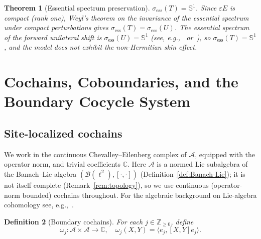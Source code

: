\documentclass[10pt]{amsart}
\newcommand{\1}{{\mathbb{I}}}
\newtheorem{theorem}{Theorem}[section]
\newtheorem{definition}[theorem]{Definition}
\numberwithin{equation}{section}
\begin{document}
\begin{theorem}[Essential spectrum preservation]\label{thm:essential-spectrum}
$\sigma_{\mathrm{ess}}(T) = \mathbb{S}^1$. Since $\varepsilon E$ is compact (rank one),
Weyl's theorem on the invariance of the essential spectrum under compact perturbations
gives $\sigma_{\mathrm{ess}}(T) = \sigma_{\mathrm{ess}}(U)$. The essential spectrum of the
forward unilateral shift is $\sigma_{\mathrm{ess}}(U) = \mathbb{S}^1$
(see, e.g.,~\cite[Ch.~II, \S7]{BotSil06} or~\cite[Vol.~1, Lec.~3]{Nik02}),
so $\sigma_{\mathrm{ess}}(T) = \mathbb{S}^1$, and the model does not exhibit the
non-Hermitian skin effect.
\end{theorem}

\section{Cochains, Coboundaries, and the Boundary Cocycle System}
\label{sec:cohomology}

\subsection{Site-localized cochains}

We work in the continuous Chevalley--Eilenberg complex of $\mathcal{A}$, equipped with the
operator norm, and trivial coefficients $\mathbb{C}$. Here $\mathcal{A}$ is a normed Lie
subalgebra of the Banach--Lie algebra $(\mathcal{B}(\ell^2),[\cdot,\cdot])$
(Definition~\ref{def:Banach-Lie}); it is not itself
complete (Remark~\ref{rem:topology}), so we use continuous (operator-norm bounded) cochains
throughout. For the algebraic background on Lie-algebra cohomology see,
e.g.,~\cite{Hall,Humphreys}.

\begin{definition}[Boundary cochains]\label{def:boundary-cocycles}
For each $j \in \mathbb{Z}_{\ge 0}$, define
\[
\omega_j : \mathcal{A} \times \mathcal{A} \to \mathbb{C},
\quad \omega_j(X,Y) = \langle e_j, [X,Y] e_j \rangle.
\]
\end{definition}
\end{document}

